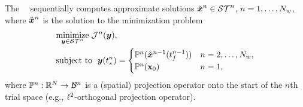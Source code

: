 The \methodAcronym\ \approachKwd\ sequentially computes approximate solutions
$\tilde{\boldsymbol x}^{n}\in\mathcal{ ST }^n$, $n=1,\ldots,N_w$, where 
$\tilde{\boldsymbol x}^{n}$ is the solution to the
minimization problem
\begin{equation}\label{eq:tclsrm}
\begin{split}
      &\underset{\boldsymbol y \in \mathcal{ ST }^n}{\text{minimize}} \; \mathcal{J}^n(\boldsymbol y), \\
			&\text{subject to } \;  \boldsymbol y(t_s^{n}) =
\begin{cases}\mathbb{P}^n (\tilde{\boldsymbol x}^{n-1}(t_f^{n-1})) & n = 2,\ldots,N_w, \\
\mathbb{P}^n( {{\mathbf{x}}_0})& n=1, \end{cases} 
\end{split}
\end{equation}
where $\mathbb{P}^{n} : \mathbb{R}^{N} \rightarrow \mathcal{B}^{n}$ 
is a (spatial) projection operator onto the start of the $n$th trial space
(e.g., $\ell^2$-orthogonal projection operator).


